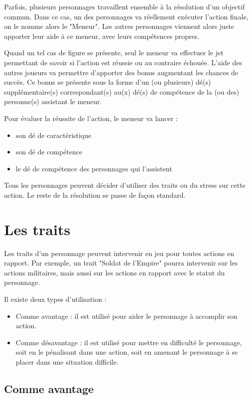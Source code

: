 Parfois, plusieurs personnages travaillent ensemble à la résolution d'un objectif commun. Dans ce cas, un des personnages va réellement exécuter l'action finale, on le nomme alors le "Meneur". Les autres personnages viennent alors juste apporter leur aide à ce meneur, avec leurs compétences propres.

Quand un tel cas de figure se présente, seul le meneur va effectuer le jet permettant de savoir si l'action est réussie ou au contraire échouée. L'aide des autres joueurs va permettre d'apporter des bonus augmentant les chances de succès. Ce bonus se présente sous la forme d'un (ou plusieurs) dé(s) supplémentaire(s) correspondant(s) au(x) dé(s) de compétence de la (ou des) personne(s) assistant le meneur.

Pour évaluer la réussite de l'action, le meneur va lancer :

\begin{itemize}
\item son dé de caractéristique
\item son dé de compétence
\item le dé de compétence des personnages qui l'assistent
\end{itemize}

Tous les personnages peuvent décider d'utiliser des traits ou du stress sur cette action. Le reste de la résolution se passe de façon standard.

\section{Les traits}

Les traits d'un personnage peuvent intervenir en jeu pour toutes actions en rapport. Par exemple, un trait "Soldat de l'Empire" pourra intervenir sur les actions militaires, mais aussi sur les actions en rapport avec le statut du personnage.

Il existe deux types d'utilisation :

\begin{itemize}
\item Comme avantage : il est utilisé pour aider le personnage à accomplir son action.
\item Comme désavantage : il est utilisé pour mettre en difficulté le personnage, soit en le pénalisant dans une action, soit en amenant le personnage à se placer dans une situation difficile.
\end{itemize}

\subsection{Comme avantage}

